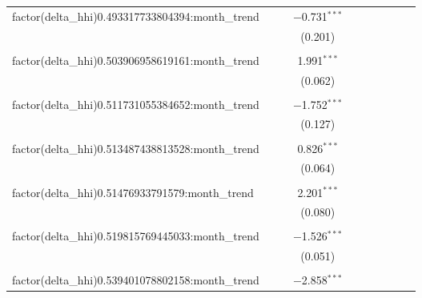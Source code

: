 \begin{table}[H]
{\begin{tabular}{@{\extracolsep{5pt}}lccccccccc}
  factor(delta\_hhi)0.493317733804394:month\_trend &  &  & $-$0.731$^{***}$ &  &  &  &  &  &  \\  

   &  &  & (0.201) &  &  &  &  &  &  \\  

   & & & & & & & & & \\  

  factor(delta\_hhi)0.503906958619161:month\_trend &  &  & 1.991$^{***}$ &  &  &  &  &  &  \\  

   &  &  & (0.062) &  &  &  &  &  &  \\  

   & & & & & & & & & \\  

  factor(delta\_hhi)0.511731055384652:month\_trend &  &  & $-$1.752$^{***}$ &  &  &  &  &  &  \\  

   &  &  & (0.127) &  &  &  &  &  &  \\  

   & & & & & & & & & \\  

  factor(delta\_hhi)0.513487438813528:month\_trend &  &  & 0.826$^{***}$ &  &  &  &  &  &  \\  

   &  &  & (0.064) &  &  &  &  &  &  \\  

   & & & & & & & & & \\  

  factor(delta\_hhi)0.51476933791579:month\_trend &  &  & 2.201$^{***}$ &  &  &  &  &  &  \\  

   &  &  & (0.080) &  &  &  &  &  &  \\  

   & & & & & & & & & \\  

  factor(delta\_hhi)0.519815769445033:month\_trend &  &  & $-$1.526$^{***}$ &  &  &  &  &  &  \\  

   &  &  & (0.051) &  &  &  &  &  &  \\  

   & & & & & & & & & \\  

  factor(delta\_hhi)0.539401078802158:month\_trend &  &  & $-$2.858$^{***}$ &  &  &  &  &  &  \\  


\end{tabular}}
\end{table}
